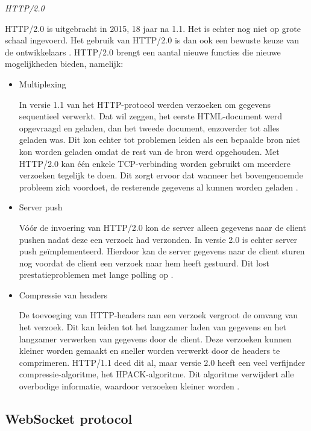 \emph{HTTP/2.0}

HTTP/2.0 is uitgebracht in 2015, 18 jaar na 1.1. Het is echter nog niet op grote schaal ingevoerd. Het gebruik van HTTP/2.0 is dan ook een bewuste keuze van de ontwikkelaars \autocite{Ab}.
HTTP/2.0 brengt een aantal nieuwe functies die nieuwe mogelijkheden bieden, namelijk:

\begin{itemize}
    \item Multiplexing
    
    In versie 1.1 van het HTTP-protocol werden verzoeken om gegevens sequentieel verwerkt. Dat wil zeggen, het eerste HTML-document werd opgevraagd en geladen, dan het tweede document, enzoverder tot alles geladen was. Dit kon echter tot problemen leiden als een bepaalde bron niet kon worden geladen omdat de rest van de bron werd opgehouden. Met HTTP/2.0 kan één enkele TCP-verbinding worden gebruikt om meerdere verzoeken tegelijk te doen. Dit zorgt ervoor dat wanneer het bovengenoemde probleem zich voordoet, de resterende gegevens al kunnen worden geladen \autocite{Cloudflare}.
    
    \item Server push
    
    Vóór de invoering van HTTP/2.0 kon de server alleen gegevens naar de client pushen nadat deze een verzoek had verzonden. In versie 2.0 is echter server push geïmplementeerd. Hierdoor kan de server gegevens naar de client sturen nog voordat de client een verzoek naar hem heeft gestuurd. Dit lost prestatieproblemen met lange polling op \autocite{Grigorik2016}.
    
    \item Compressie van headers
    
    De toevoeging van HTTP-headers aan een verzoek vergroot de omvang van het verzoek. Dit kan leiden tot het langzamer laden van gegevens en het langzamer verwerken van gegevens door de client. Deze verzoeken kunnen kleiner worden gemaakt en sneller worden verwerkt door de headers te comprimeren. HTTP/1.1 deed dit al, maar versie 2.0 heeft een veel verfijnder compressie-algoritme, het HPACK-algoritme. Dit algoritme verwijdert alle overbodige informatie, waardoor verzoeken kleiner worden \autocite{Cloudflare}.
\end{itemize}

\subsection {WebSocket protocol}

